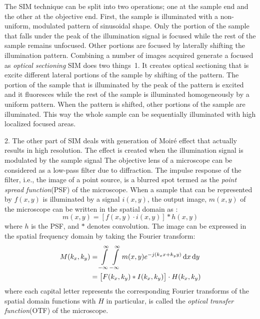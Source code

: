 \documentclass[11pt]{article}
\begin{document}
The SIM technique can be split into two operations; one at the sample end and the other at the objective end. First, the sample is illuminated with a non-uniform, modulated pattern of sinusoidal shape. Only the portion of the sample that falls under the peak of the illumination signal is focused while the rest of the sample remains unfocused. Other portions are focused by laterally shifting the illumination pattern. Combining a number of images acquired generate a focused  as \emph{optical sectioning}
SIM does two things\
1. It creates optical sectioning that is excite different lateral portions of the sample by shifting of the pattern. The portion of the sample that is illuminated by the peak of the pattern is excited and it fluoresces while the rest of the sample is illuminated homogeneously by a uniform pattern. When the pattern is shifted, other portions of the sample are illuminated. This way the whole sample can be sequentially illuminated with high localized focused areas.

2. The other part of SIM deals with generation of Moiré effect that actually results in high resolution. The effect is created when the illumination signal is modulated by the sample signal
The objective lens of a microscope can be considered as a low-pass filter due to diffraction. The impulse response of the filter, i.e., the image of a point source, is a blurred spot termed as the \emph{point spread function}(PSF) of the microscope. When a sample that can be represented by $f(x,y)$ is illuminated by a signal $i(x,y)$, the output image, $m(x,y)$ of the microscope can be written in the spatial domain as \cite{Jost_2013}:
%
\begin{equation}
  m(x,y) = \left[ f(x,y) \cdot i(x,y) \right] \ast h(x,y)
  \label{eq:microscope}
\end{equation}
%
where $h$ is the PSF, and $\ast$ denotes convolution.
The image can be expressed in the spatial frequency domain by taking the Fourier transform:
%
\begin{equation}
  \begin{split}
    M(k_x, k_y) &= \int \limits_{-\infty}^{\infty} \int \limits_{-\infty}^{\infty}   m(x,y) e^{-j(k_x x + k_y y)} \mathop{}\!\mathrm{d}{x}\mathop{}\!\mathrm{d}{y} \\
    &=  \left[ F(k_x,k_y) \ast I(k_x,k_y) \right] \cdot H(k_x,k_y)
  \end{split}
  \label{eq:FT}
\end{equation}
%
where each capital letter represents the corresponding Fourier transforms of the spatial domain functions with $H$ in particular, is called the \emph{optical transfer function}(OTF) of the microscope.
\end{document}
